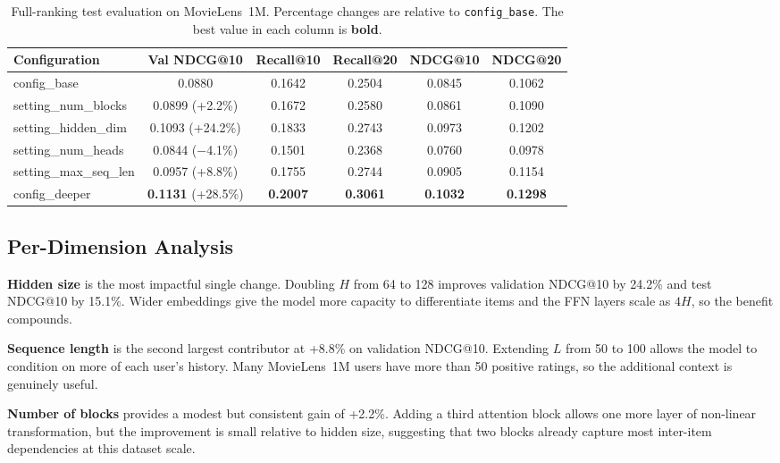 \documentclass[sigconf]{acmart}
\begin{document}
\begin{table}[t]
\centering
\caption{%
  Full-ranking test evaluation on MovieLens~1M.
  Percentage changes are relative to \texttt{config\_base}.
  The best value in each column is \textbf{bold}.
}
\label{tab:results}
\begin{tabular}{lccccc}
\toprule
Configuration        & Val NDCG@10 & Recall@10 & Recall@20 & NDCG@10 & NDCG@20 \\
\midrule
config\_base          & 0.0880           & 0.1642    & 0.2504    & 0.0845  & 0.1062  \\
setting\_num\_blocks   & 0.0899 {\small (+2.2\%)}  & 0.1672    & 0.2580    & 0.0861  & 0.1090  \\
setting\_hidden\_dim   & 0.1093 {\small (+24.2\%)} & 0.1833    & 0.2743    & 0.0973  & 0.1202  \\
setting\_num\_heads    & 0.0844 {\small ($-$4.1\%)} & 0.1501    & 0.2368    & 0.0760  & 0.0978  \\
setting\_max\_seq\_len  & 0.0957 {\small (+8.8\%)}  & 0.1755    & 0.2744    & 0.0905  & 0.1154  \\
config\_deeper        & \textbf{0.1131} {\small (+28.5\%)} & \textbf{0.2007} & \textbf{0.3061} & \textbf{0.1032} & \textbf{0.1298} \\
\bottomrule
\end{tabular}
\end{table}

\subsection{Per-Dimension Analysis}

\textbf{Hidden size} is the most impactful single change. Doubling $H$ from 64
to 128 improves validation NDCG@10 by 24.2\% and test NDCG@10 by 15.1\%. Wider
embeddings give the model more capacity to differentiate items and the FFN
layers scale as $4H$, so the benefit compounds.

\textbf{Sequence length} is the second largest contributor at +8.8\% on
validation NDCG@10. Extending $L$ from 50 to 100 allows the model to condition
on more of each user's history. Many MovieLens~1M users have more than 50
positive ratings, so the additional context is genuinely useful.

\textbf{Number of blocks} provides a modest but consistent gain of +2.2\%.
Adding a third attention block allows one more layer of non-linear
transformation, but the improvement is small relative to hidden size, suggesting
that two blocks already capture most inter-item dependencies at this dataset
scale.
\end{document}
